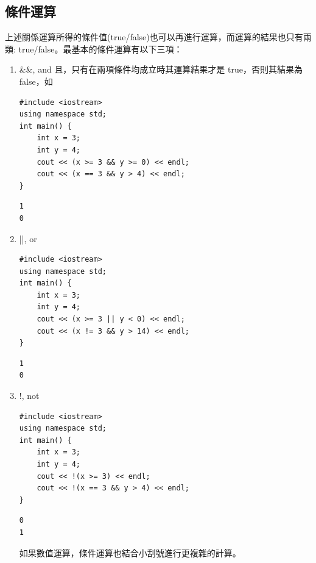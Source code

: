 \documentclass[a4paper,12pt]{article}
\begin{document}
\subsection{條件運算}
\label{sec:org17e8bfd}
上述關係運算所得的條件值(true/false)也可以再進行運算，而運算的結果也只有兩類: true/false。最基本的條件運算有以下三項：\\
\begin{enumerate}
\item \&\&, and
\label{sec:orgcbdc0d6}
且，只有在兩項條件均成立時其運算結果才是 true，否則其結果為 false，如\\
\lstset{breaklines=true,language=cpp,label= ,caption= ,captionpos=b,firstnumber=1,numbers=left}
\begin{lstlisting}
#include <iostream>
using namespace std;
int main() {
    int x = 3;
    int y = 4;
    cout << (x >= 3 && y >= 0) << endl;
    cout << (x == 3 && y > 4) << endl;
}
\end{lstlisting}

\begin{verbatim}
1
0
\end{verbatim}

\item ||, or
\label{sec:org576d6ad}
\lstset{breaklines=true,language=cpp,label= ,caption= ,captionpos=b,firstnumber=1,numbers=left}
\begin{lstlisting}
#include <iostream>
using namespace std;
int main() {
    int x = 3;
    int y = 4;
    cout << (x >= 3 || y < 0) << endl;
    cout << (x != 3 && y > 14) << endl;
}
\end{lstlisting}

\begin{verbatim}
1
0
\end{verbatim}

\item !, not
\label{sec:org74a009f}
\lstset{breaklines=true,language=cpp,label= ,caption= ,captionpos=b,firstnumber=1,numbers=left}
\begin{lstlisting}
#include <iostream>
using namespace std;
int main() {
    int x = 3;
    int y = 4;
    cout << !(x >= 3) << endl;
    cout << !(x == 3 && y > 4) << endl;
}
\end{lstlisting}

\begin{verbatim}
0
1
\end{verbatim}


如果數值運算，條件運算也結合小刮號進行更複雜的計算。\\
\end{enumerate}
\end{document}
